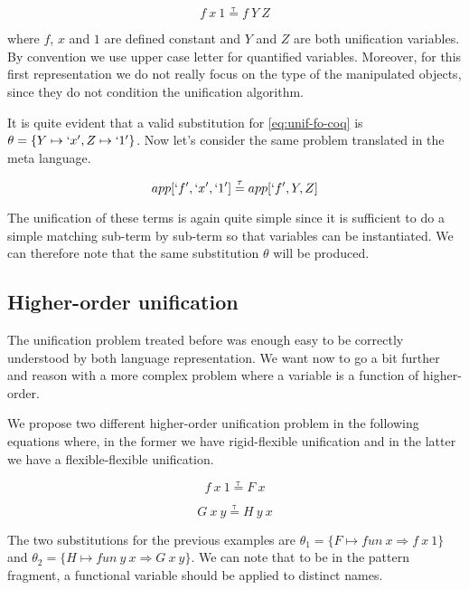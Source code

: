 \documentclass[acmengage]{acmart}
\newcommand*{\eqtau}{\ensuremath{\mathrel{\overset{\mathrm{\tau}}{=}}}}
\begin{document}
\begin{equation}
  f\ x\ 1 \eqtau f\ Y\ Z
  \label{eq:unif-fo-coq}
\end{equation}

\noindent where $f$, $x$ and $1$ are defined constant and $Y$ and $Z$ are both
unification variables. By convention we use upper case letter for quantified
variables. Moreover, for this first representation we do not really focus on the
type of the manipulated objects, since they do not condition the unification
algorithm.

It is quite evident that a valid substitution for \cref{eq:unif-fo-coq} is $\theta =
\{Y \mapsto `x', Z \mapsto `1'\}$. Now let's consider the same problem translated in
the meta language.

\begin{equation}
  app[`f', `x', `1'] \eqtau app[`f', Y, Z]
  \label{eq:unif-fo-elpi}
\end{equation}

The unification of these terms is again quite simple since it is sufficient to
do a simple matching sub-term by sub-term so that variables can be instantiated.
We can therefore note that the same substitution $\theta$ will be produced.

\subsection{Higher-order unification}

The unification problem treated before was enough easy to be correctly
understood by both language representation. We want now to go a bit further and
reason with a more complex problem where a variable is a function of
higher-order. 

We propose two different higher-order unification problem in the following
equations where, in the former we have rigid-flexible unification and in the
latter we have a flexible-flexible unification.

\begin{equation}
  f\ x\ 1 \eqtau F\ x
  \label{eq:unif-ho-coq1}
\end{equation}

\begin{equation}
  G\ x\ y \eqtau H\ y\ x
  \label{eq:unif-ho-coq2}
\end{equation}

The two substitutions for the previous examples are $\theta_1 = \{F \mapsto fun\
x \Rightarrow f\ x\ 1\}$ and $\theta_2 = \{H \mapsto fun\ y\ x \Rightarrow G\ x\
y\}$. We can note that to be in the pattern fragment, a functional variable
should be applied to distinct names.
\end{document}
